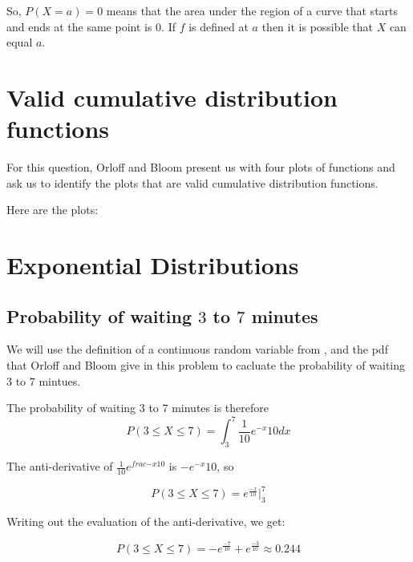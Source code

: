 \documentclass[a4paper,11pt]{article}
\begin{document}
So, $P \left(X = a \right) = 0$ means that the area under the region of a curve
that starts and ends at the same point is 0. If $f$ is defined at $a$ then
it is possible that $X$ can equal $a$.

\section{Valid cumulative distribution functions}
For this question, Orloff and Bloom present us with four plots of functions
and ask us to identify the plots that are valid cumulative distribution
functions.

Here are the plots:


\section{Exponential Distributions}
\subsection{Probability of waiting $3$ to $7$ minutes}
We will use the definition of a continuous random variable
from \cite{reading5b}, and the pdf that Orloff and Bloom give
in this problem to cacluate the probability of waiting $3$
to $7$ mintues.

The probability of waiting $3$ to $7$ minutes is therefore
\begin{equation}
P \left( 3 \leq X \leq 7 \right)
  = \int_{3}^{7} \frac{1}{10}e^{-x}{10} dx
\end{equation}

The anti-derivative of $\frac{1}{10}e^{frac{-x}{10}}$ is $-e^{-x}{10}$, \cite{expInt}so

\begin{equation}
P \left( 3 \leq X \leq 7 \right)
  = e^{\frac{-x}{10}} \bigg\rvert_{3}^{7}
\end{equation}

Writing out the evaluation of the anti-derivative, we get:

\begin{equation}
P \left( 3 \leq X \leq 7 \right)
  = -e^{\frac{-7}{10}} + e^{\frac{-3}{10}} \approx 0.244
\end{equation}
\end{document}
